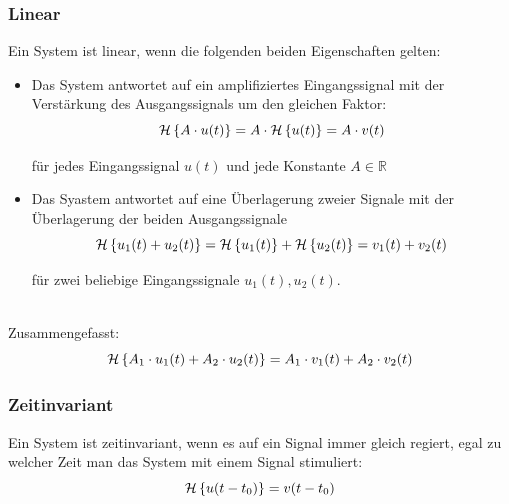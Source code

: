 \subsubsection{Linear}
Ein System ist linear, wenn die folgenden beiden Eigenschaften gelten:
\begin{itemize}
	\item Das System antwortet auf ein amplifiziertes Eingangssignal mit der Verstärkung des Ausgangssignals um den gleichen Faktor:
	\[
		\mathcal{H}\left\lbrace A \cdot u(t)\right\rbrace= A \cdot \mathcal{H}\left\lbrace u(t)\right\rbrace = A \cdot v(t)
	\]
	\begin{footnotesize}
		für jedes Eingangssignal $u(t)$ und jede Konstante $A \in \mathbb{R}$\\
	\end{footnotesize}
	\item Das Syastem antwortet auf eine Überlagerung zweier Signale mit der Überlagerung der beiden Ausgangssignale
	\[
		\mathcal{H}\left\lbrace u_1(t) + u_2(t)\right\rbrace = \mathcal{H}\left\lbrace u_1(t)\right\rbrace + \mathcal{H}\left\lbrace u_2(t)\right\rbrace = v_1(t) + v_2(t)
	\]
	\begin{footnotesize}
		für zwei beliebige Eingangssignale $u_1(t),u_2(t)$.\\\\
	\end{footnotesize}
\end{itemize}
Zusammengefasst:
\[
	\mathcal{H}\left\lbrace A_1 \cdot u_1(t) + A_2 \cdot u_2(t)\right\rbrace = A_1 \cdot v_1(t) + A_2 \cdot v_2(t)
\]

\subsubsection{Zeitinvariant}
Ein System ist zeitinvariant, wenn es auf ein Signal immer gleich regiert, egal zu welcher Zeit man das System mit einem Signal stimuliert:
\[
	\mathcal{H}\left\lbrace u(t-t_0)\right\rbrace = v(t-t_0)
\]
